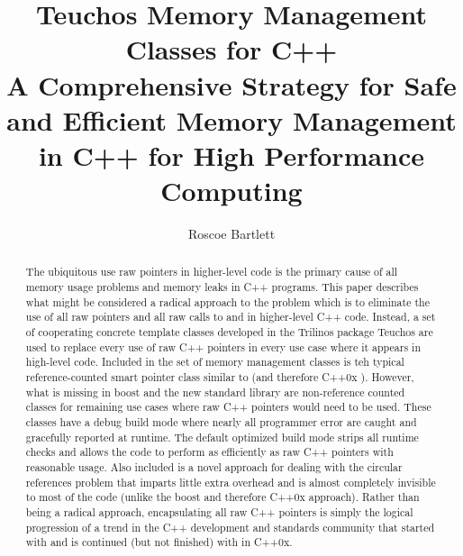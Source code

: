 \documentclass[pdf,ps2pdf,11pt]{SANDreport}
\title{\center
Teuchos Memory Management Classes for C++ \\[2ex] A Comprehensive
Strategy for Safe and Efficient Memory Management in C++ for High
Performance Computing }
\author{
Roscoe Bartlett
}
\date{}
\begin{document}
\maketitle


%


%
\begin{abstract}
%


The ubiquitous use raw pointers in higher-level code is the primary
cause of all memory usage problems and memory leaks in C++
programs. This paper describes what might be considered a radical
approach to the problem which is to eliminate the use of all raw
pointers and all raw calls to {} and {} in
higher-level C++ code.  Instead, a set of cooperating concrete
template classes developed in the Trilinos package Teuchos are used to
replace every use of raw C++ pointers in every use case where it
appears in high-level code.  Included in the set of memory management
classes is teh typical reference-counted smart pointer class similar
to {} (and therefore C++0x
{}).  However, what is missing in boost and the
new standard library are non-reference counted classes for remaining
use cases where raw C++ pointers would need to be used.  These classes
have a debug build mode where nearly all programmer error are caught
and gracefully reported at runtime.  The default optimized build mode
strips all runtime checks and allows the code to perform as
efficiently as raw C++ pointers with reasonable usage.  Also included
is a novel approach for dealing with the circular references problem
that imparts little extra overhead and is almost completely invisible
to most of the code (unlike the boost and therefore C++0x approach).
Rather than being a radical approach, encapsulating all raw C++
pointers is simply the logical progression of a trend in the C++
development and standards community that started with
{} and is continued (but not finished) with
{} in C++0x.

%
\end{abstract}
%

%
%
%
\end{document}
